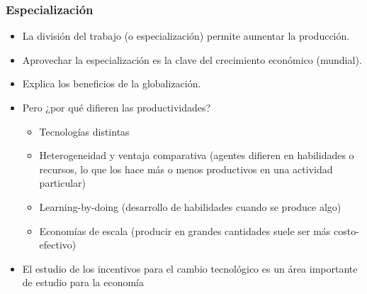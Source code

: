 \documentclass{beamer}
\begin{document}
\begin{frame}
\frametitle{Especialización}
\begin{itemize}
    \item La división del trabajo (o especialización) permite aumentar la producción.
     \item Aprovechar la especialización es la clave del crecimiento económico (mundial).
     \item  Explica los beneficios de la globalización.
  \item Pero ¿por qué difieren las productividades?

    \begin{itemize}\vspace{2mm}
        \item Tecnologías distintas
        \item Heterogeneidad y ventaja comparativa (agentes difieren en habilidades o recursos, lo que los hace más o menos productivos en una actividad particular)
        \item Learning-by-doing (desarrollo de habilidades cuando se produce algo)
        \item Economías de escala (producir en grandes cantidades suele ser más costo-efectivo) \vspace{2mm}
    \end{itemize}
        \item El estudio de los incentivos para el cambio tecnológico es un área importante de estudio para la economía
\end{itemize} 
\end{frame}
\end{document}
